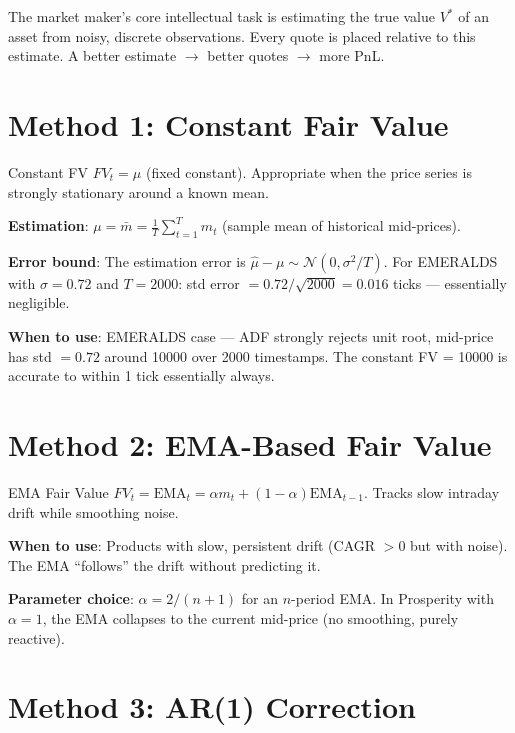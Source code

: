 \documentclass[12pt,a4paper,openany]{report}
\theoremstyle{definition}
\begin{document}
The market maker's core intellectual task is estimating the true value $V^*$ of an asset from noisy, discrete observations. Every quote is placed relative to this estimate. A better estimate $\to$ better quotes $\to$ more PnL.

\section{Method 1: Constant Fair Value}

\begin{definitionbox}{Constant FV}
$FV_t = \mu$ (fixed constant). Appropriate when the price series is strongly stationary around a known mean.
\end{definitionbox}

\textbf{Estimation}: $\mu = \bar{m} = \frac{1}{T}\sum_{t=1}^T m_t$ (sample mean of historical mid-prices).

\textbf{Error bound}: The estimation error is $\hat{\mu} - \mu \sim \mathcal{N}(0, \sigma^2/T)$. For EMERALDS with $\sigma = 0.72$ and $T = 2000$: std error $= 0.72/\sqrt{2000} = 0.016$ ticks — essentially negligible.

\textbf{When to use}: EMERALDS case — ADF strongly rejects unit root, mid-price has std $= 0.72$ around 10000 over 2000 timestamps. The constant FV = 10000 is accurate to within 1 tick essentially always.

\section{Method 2: EMA-Based Fair Value}

\begin{definitionbox}{EMA Fair Value}
$FV_t = \text{EMA}_t = \alpha m_t + (1-\alpha)\text{EMA}_{t-1}$. Tracks slow intraday drift while smoothing noise.
\end{definitionbox}

\textbf{When to use}: Products with slow, persistent drift (CAGR $>0$ but with noise). The EMA ``follows'' the drift without predicting it.

\textbf{Parameter choice}: $\alpha = 2/(n+1)$ for an $n$-period EMA. In Prosperity with $\alpha = 1$, the EMA collapses to the current mid-price (no smoothing, purely reactive).

\section{Method 3: AR(1) Correction}
\end{document}
